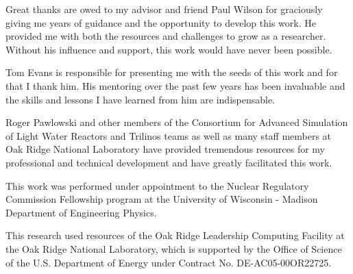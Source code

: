 Great thanks are owed to my advisor and friend Paul Wilson for
graciously giving me years of guidance and the opportunity to develop
this work. He provided me with both the resources and challenges to
grow as a researcher. Without his influence and support, this work
would have never been possible.

Tom Evans is responsible for presenting me with the seeds of this work
and for that I thank him. His mentoring over the past few years has
been invaluable and the skills and lessons I have learned from him are
indispensable.

Roger Pawlowski and other members of the Consortium for Advanced
Simulation of Light Water Reactors and Trilinos teams as well as many
staff members at Oak Ridge National Laboratory have provided
tremendous resources for my professional and technical development and
have greatly facilitated this work.

This work was performed under appointment to the Nuclear Regulatory
Commission Fellowship program at the University of Wisconsin - Madison
Department of Engineering Physics.

This research used resources of the Oak Ridge Leadership Computing
Facility at the Oak Ridge National Laboratory, which is supported by
the Office of Science of the U.S. Department of Energy under Contract
No. DE-AC05-00OR22725.
